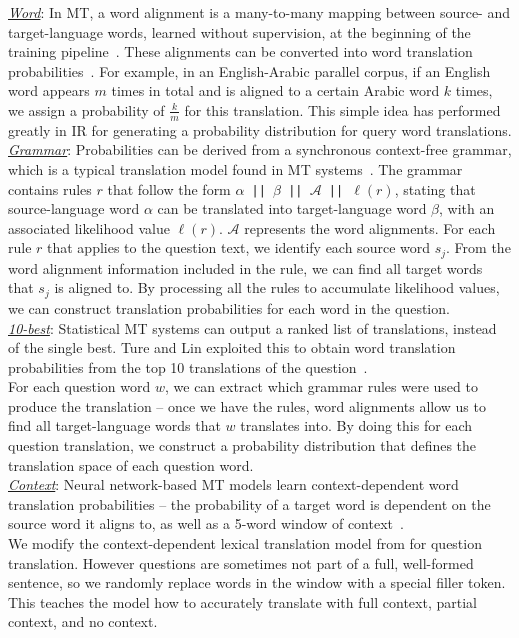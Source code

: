 \documentclass{sig-alternate-05-2015}
\begin{document}
\noindent \underline{\emph{Word}}: In MT, a word alignment is a many-to-many mapping between source- and target-language words,
learned without supervision, at the beginning of the training pipeline~\cite{Och:2003a}.
These alignments can be converted into word translation probabilities~\cite{Darwish:2003aa}.
For example, in an English-Arabic parallel corpus, if an English word appears $m$ times in total and is aligned to a certain Arabic 
word $k$ times, we assign a probability of $\frac{k}{m}$ for this translation. This simple idea has performed greatly in IR for 
generating a probability distribution for query word translations.\\
\underline{\emph{Grammar}}: Probabilities can be derived from a synchronous context-free grammar, which is a typical
translation model found in MT systems~\cite{Ture:2014aa}. 
The grammar contains rules $r$ that follow the form {\tt $\alpha$ || $\beta$ || $\mathcal{A}$ || $\ell(r)$}, 
stating that source-language word $\alpha$ can be translated into target-language word $\beta$, with an associated likelihood value 
$\ell(r)$. $\mathcal{A}$ represents the word alignments.
For each rule $r$ that applies to the question text, we identify each source word $s_j$. From the word
alignment information included in the rule, we can find all target words that $s_j$ is aligned to.
By processing all the rules to accumulate likelihood values, we can construct translation probabilities for each word in the question.\\
\underline{\emph{10-best}}: Statistical MT systems can output a ranked list of translations, instead of the single best. 
Ture and Lin exploited this to obtain word translation probabilities from the top 10 translations of the question~\cite{Ture:2014aa}.\\
For each question word $w$, we can extract which grammar rules were used to produce the translation -- once we have the
rules, word alignments allow us to find all target-language words that $w$ translates into.
By doing this for each question translation, we construct a probability distribution that defines the translation space of each
question word.\\
\underline{\emph{Context}}: Neural network-based MT models learn context-dependent word translation probabilities -- 
the probability of a target word is dependent on the source word it aligns to, as well as a 5-word window of context~\cite{Devlin:2014}.\\
We modify the context-dependent lexical translation model from \cite{Devlin:2014} for question 
translation.  
However questions are sometimes not part of a full, well-formed sentence, so we randomly replace 
words in the window with a special filler token. This teaches the model how to accurately translate with full context, partial 
context, and no context.\\
\end{document}
